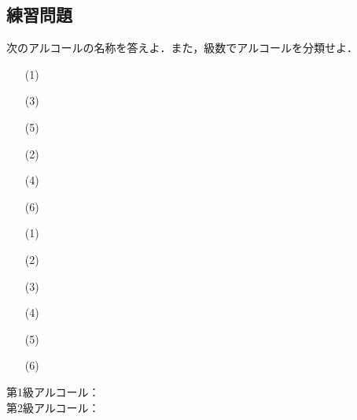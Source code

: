 \documentclass[a4paper,12pt]{ltjsreport}
\title{}
\author{}
\date{}
\begin{document}
\subsection*{練習問題}
\begin{que}
次のアルコールの名称を答えよ．また，級数でアルコールを分類せよ．\\[5pt]
\begin{minipage}{0.5\linewidth}
    \begin{itemize}
        \item [(1)]\\
        \item [(3)]\\[5pt]
        \item [(5)]
    \end{itemize}
\end{minipage}
\begin{minipage}{0.5\linewidth}
\begin{itemize}
    \item [(2)]\\
    \item [(4)]\\[5pt]
    \item [(6)]
\end{itemize}
\end{minipage}
\end{que}
\ans
\begin{itemize}
    \item [(1)]　\\
    \item [(2)]　\\
     \item [(3)]　\\
      \item [(4)]　\\
       \item [(5)]　\\
        \item [(6)]　\\
\end{itemize}
    第1級アルコール：　\\[7pt]

   \noindent  第2級アルコール：　\\[7pt]
\end{document}
